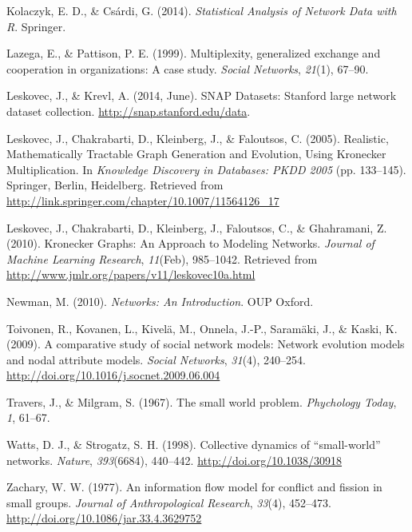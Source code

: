 \documentclass[12pt,twoside]{amherstthesis}
\begin{document}
  \hypertarget{ref-kolaczyk_statistical_2014}{}
  Kolaczyk, E. D., \& Csárdi, G. (2014). \emph{Statistical Analysis of
  Network Data with R}. Springer.
  
  \hypertarget{ref-lazega1999multiplexity}{}
  Lazega, E., \& Pattison, P. E. (1999). Multiplexity, generalized
  exchange and cooperation in organizations: A case study. \emph{Social
  Networks}, \emph{21}(1), 67--90.
  
  \hypertarget{ref-snapnets}{}
  Leskovec, J., \& Krevl, A. (2014, June). SNAP Datasets: Stanford large
  network dataset collection. \url{http://snap.stanford.edu/data}.
  
  \hypertarget{ref-leskovec_realistic_2005}{}
  Leskovec, J., Chakrabarti, D., Kleinberg, J., \& Faloutsos, C. (2005).
  Realistic, Mathematically Tractable Graph Generation and Evolution,
  Using Kronecker Multiplication. In \emph{Knowledge Discovery in
  Databases: PKDD 2005} (pp. 133--145). Springer, Berlin, Heidelberg.
  Retrieved from
  \url{http://link.springer.com/chapter/10.1007/11564126_17}
  
  \hypertarget{ref-leskovec_kronecker_2010}{}
  Leskovec, J., Chakrabarti, D., Kleinberg, J., Faloutsos, C., \&
  Ghahramani, Z. (2010). Kronecker Graphs: An Approach to Modeling
  Networks. \emph{Journal of Machine Learning Research}, \emph{11}(Feb),
  985--1042. Retrieved from
  \url{http://www.jmlr.org/papers/v11/leskovec10a.html}
  
  \hypertarget{ref-newman_networks:_2010}{}
  Newman, M. (2010). \emph{Networks: An Introduction}. OUP Oxford.
  
  \hypertarget{ref-toivonen_comparative_2009}{}
  Toivonen, R., Kovanen, L., Kivelä, M., Onnela, J.-P., Saramäki, J., \&
  Kaski, K. (2009). A comparative study of social network models: Network
  evolution models and nodal attribute models. \emph{Social Networks},
  \emph{31}(4), 240--254.
  \url{http://doi.org/10.1016/j.socnet.2009.06.004}
  
  \hypertarget{ref-travers1967small}{}
  Travers, J., \& Milgram, S. (1967). The small world problem.
  \emph{Phychology Today}, \emph{1}, 61--67.
  
  \hypertarget{ref-watts_collective_1998}{}
  Watts, D. J., \& Strogatz, S. H. (1998). Collective dynamics of
  ``small-world'' networks. \emph{Nature}, \emph{393}(6684), 440--442.
  \url{http://doi.org/10.1038/30918}
  
  \hypertarget{ref-zachskarateclub}{}
  Zachary, W. W. (1977). An information flow model for conflict and
  fission in small groups. \emph{Journal of Anthropological Research},
  \emph{33}(4), 452--473. \url{http://doi.org/10.1086/jar.33.4.3629752}


\end{document}
